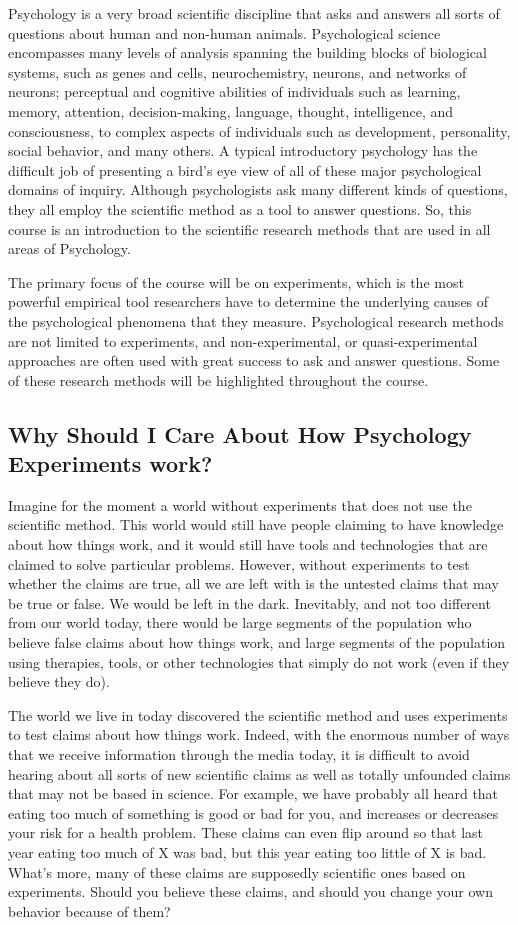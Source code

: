 Psychology is a very broad scientific discipline that asks and answers all sorts of questions about human and non-human animals. Psychological science encompasses many levels of analysis spanning the building blocks of biological systems, such as genes and cells, neurochemistry, neurons, and networks of neurons; perceptual and cognitive abilities of individuals such as learning, memory, attention, decision-making, language, thought, intelligence, and consciousness, to complex aspects of individuals such as development, personality, social behavior, and many others. A typical introductory psychology has the difficult job of presenting a bird's eye view of all of these major psychological domains of inquiry. Although psychologists ask many different kinds of questions, they all employ the scientific method as a tool to answer questions. So, this course is an introduction to the scientific research methods that are used in all areas of Psychology.

The primary focus of the course will be on experiments, which is the most powerful empirical tool researchers have to determine the underlying causes of the psychological phenomena that they measure. Psychological research methods are not limited to experiments, and non-experimental, or quasi-experimental approaches are often used with great success to ask and answer questions. Some of these research methods will be highlighted throughout the course.

\subsection{Why Should I Care About How Psychology Experiments work?}

Imagine for the moment a world without experiments that does not use the scientific method. This world would still have people claiming to have knowledge about how things work, and it would still have tools and technologies that are claimed to solve particular problems. However, without experiments to test whether the claims are true, all we are left with is the untested claims that may be true or false. We would be left in the dark. Inevitably, and not too different from our world today, there would be large segments of the population who believe false claims about how things work, and large segments of the population using therapies, tools, or other technologies that simply do not work (even if they believe they do).

The world we live in today discovered the scientific method and uses experiments to test claims about how things work. Indeed, with the enormous number of ways that we receive information through the media today, it is difficult to avoid hearing about all sorts of new scientific claims as well as totally unfounded claims that may not be based in science. For example, we have probably all heard that eating too much of something is good or bad for you, and increases or decreases your risk for a health problem. These claims can even flip around so that last year eating too much of X was bad, but this year eating too little of X is bad. What's more, many of these claims are supposedly scientific ones based on experiments. Should you believe these claims, and should you change your own behavior because of them?

